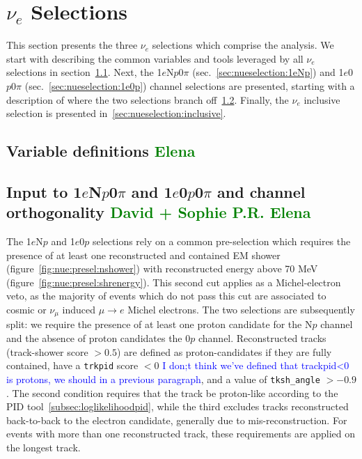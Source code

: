 \documentclass[a4paper]{article}
\newcommand{\npsel}{1$e$N$p$0$\pi$ }
\newcommand{\zpsel}{1$e$0$p$0$\pi$ }
\begin{document}
\section{$\nu_e$ Selections}
\label{sec:nueselection}
\par This section presents the three $\nu_e$ selections which comprise the analysis. We start with describing the common variables and tools leveraged by all $\nu_e$ selections in section~\ref{sec:nueselection:variables}. Next, the \npsel (sec.~\ref{sec:nueselection:1eNp}) and \zpsel (sec.~\ref{sec:nueselection:1e0p}) channel selections are presented, starting with a description of where the two selections branch off~\ref{sec:nueselection:inputs}. Finally, the $\nu_e$ inclusive selection is presented in~\ref{sec:nueselection:inclusive}.

\subsection{Variable definitions \textcolor{green}{Elena}}
\label{sec:nueselection:variables}

\clearpage

\subsection{Input to \npsel and \zpsel and channel orthogonality \textcolor{green}{David + Sophie P.R. Elena} }
\label{sec:nueselection:inputs}

The 1$e$N$p$ and 1$e$0$p$ selections rely on a common pre-selection which requires the presence of at least one reconstructed and contained EM shower (figure~\ref{fig:nue:presel:nshower}) with reconstructed energy above 70 MeV (figure~\ref{fig:nue:presel:shrenergy}). This second cut applies as a Michel-electron veto, as the majority of events which do not pass this cut are associated to cosmic or $\nu_{\mu}$ induced $\mu \rightarrow e$ Michel electrons. The two selections are subsequently split: we require the presence of at least one proton candidate for the N$p$ channel and the absence of proton candidates the 0$p$ channel. Reconstructed tracks (track-shower score $> 0.5$) are defined as proton-candidates if they are fully contained,  have a \texttt{trkpid} score $< 0$ \textcolor{blue}{I don;t think we've defined that trackpid<0 is protons, we should in a previous paragraph}, and a value of \texttt{tksh\_angle} $> -0.9$. The second condition requires that the track be proton-like according to the PID tool~\ref{subsec:loglikelihoodpid}, while the third excludes tracks reconstructed back-to-back to the electron candidate, generally due to mis-reconstruction. For events with more than one reconstructed track, these requirements are applied on the longest track.
\end{document}
